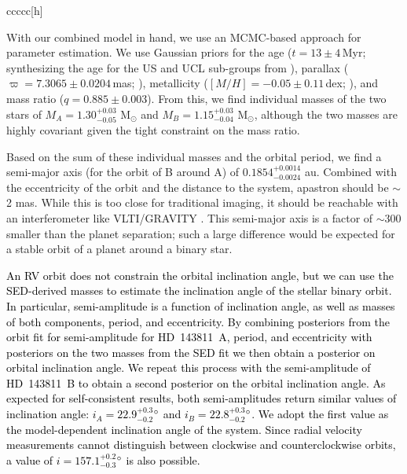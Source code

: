 \documentclass[]{aastex701} %
\begin{document}
\begin{deluxetable}{ccccc}[h]
\end{deluxetable}

With our combined model in hand, we use an MCMC-based approach for parameter estimation. We use Gaussian priors for the age ($t=13\pm4$\,Myr; synthesizing the age for the US and UCL sub-groups from \citealp{pecaut:2016}), parallax ($\varpi=7.3065\pm0.0204$\,mas; \citealp{GaiaDR3}), metallicity ($[M/H]=-0.05\pm0.11$\,dex; \citealp{Nielsen:2013}), and mass ratio ($q=0.885\pm0.003$). From this, we find individual masses of the two stars of $M_A = 1.30^{+0.03}_{-0.05}$ M$_\odot$ and $M_B = 1.15^{+0.03}_{-0.04}$ M$_\odot$, although the two masses are highly covariant given the tight constraint on the mass ratio.

Based on the sum of these individual masses and the orbital period, we find a semi-major axis (for the orbit of B around A) of $0.1854^{+0.0014}_{-0.0024}$ au. Combined with the eccentricity of the orbit and the distance to the system, apastron should be $\sim$2 mas. While this is too close for traditional imaging, it should be reachable with an interferometer like VLTI/GRAVITY \citep{gravity:2017}. This semi-major axis is a factor of $\sim$300 smaller than the planet separation; such a large difference would be expected for a stable orbit of a planet around a binary star.

\textcolor{black}{An RV orbit does not constrain the orbital inclination angle, but we can use the SED-derived masses to estimate the inclination angle of the stellar binary orbit. In particular, semi-amplitude is a function of inclination angle, as well as masses of both components, period, and eccentricity. By combining posteriors from the orbit fit for semi-amplitude for HD~143811~A, period, and eccentricity with posteriors on the two masses from the SED fit we then obtain a posterior on orbital inclination angle. We repeat this process with the semi-amplitude of HD~143811~B to obtain a second posterior on the orbital inclination angle. As expected for self-consistent results, both semi-amplitudes return similar values of inclination angle: $i_A = 22.9^{+0.3}_{-0.2} $$ \degree$ and $i_B = 22.8^{+0.3}_{-0.2}$$ \degree$. We adopt the first value as the model-dependent inclination angle of the system. Since radial velocity measurements cannot distinguish between clockwise and counterclockwise orbits, a value of $i = 157.1^{+0.2}_{-0.3} $$ \degree$ is also possible.}
\end{document}
